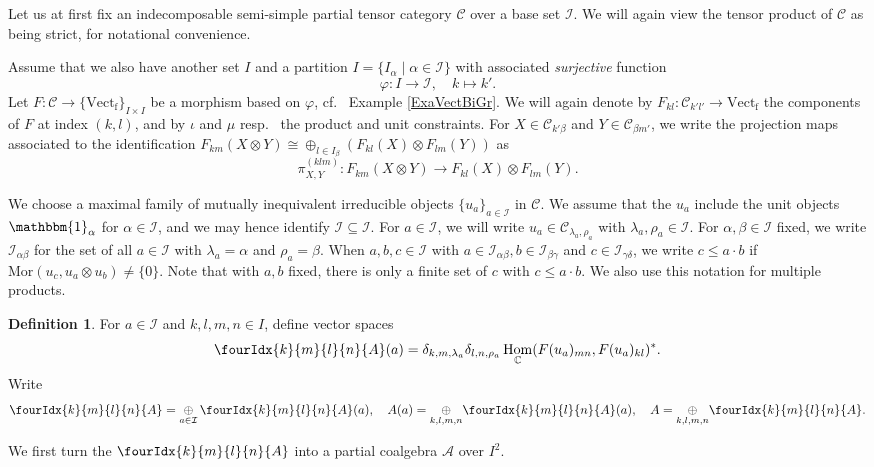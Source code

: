 \documentclass[11pt]{article}
\DeclareMathOperator{\fin}{\mathrm{f}}
\DeclareMathOperator{\Hom}{Hom}
\newcommand{\C}{\mathbb{C}}
\newcommand{\CatC}{\mathcal{C}}
\newcommand{\CatCC}{\mathscr{C}}
\newcommand{\Mor}{\mathrm{Mor}}
\newcommand{\Vect}{\mathrm{Vect}}
\newcommand{\Unitb}{\mathbbm{1}}
\newcommand{\Gr}[5]{\fourIdx{#2}{#4}{#3}{#5}{#1}}%
\theoremstyle{definition}
\newtheorem{Def}[Theorem]{Definition}
\numberwithin{equation}{section}
\begin{document}
Let us at first fix an indecomposable semi-simple partial tensor category $\CatCC$ over a base set $\mathscr{I}$. We will again view the tensor product of $\CatC$ as being strict, for notational convenience. 

Assume that we also have another set $I$ and a partition $I = \{I_\alpha\mid \alpha\in \mathscr{I}\}$ with associated \emph{surjective} function \[\varphi:I\rightarrow \mathscr{I}, \quad k\mapsto k'.\] Let $F: \CatCC\rightarrow \{\Vect_{\fin}\}_{I\times I}$ be a morphism based on $\varphi$, cf.~ Example \ref{ExaVectBiGr}.  We will again denote by $F_{kl}:\CatCC_{k'l'}\rightarrow \Vect_{\fin}$ the components of $F$ at index $(k,l)$, and by $\iota$ and $\mu$ resp.~ the product and unit constraints.  For $X\in \CatC_{k'\beta}$ and $Y\in \CatC_{\beta m'}$, we write the projection maps associated to the identification $F_{km}(X\otimes Y)\cong \oplus_{l\in I_\beta} \left(F_{kl}(X)\otimes F_{lm}(Y)\right)$ as \[\pi^{(klm)}_{X,Y}:F_{km}(X\otimes Y) \rightarrow F_{kl}(X)\otimes F_{lm}(Y).\]

We choose a maximal family of mutually inequivalent irreducible objects $\{u_a\}_{a\in \mathcal{I}}$ in $\CatC$. We assume that the $u_a$ include the unit objects $\Unitb_{\alpha}$ for $\alpha\in \mathscr{I}$, and we may hence identify $\mathscr{I}\subseteq \mathcal{I}$. For $a\in \mathcal{I}$, we will write $u_a \in \CatC_{\lambda_a,\rho_a}$ with $\lambda_a,\rho_a\in \mathscr{I}$. For $\alpha,\beta\in \mathscr{I}$ fixed, we write $\mathcal{I}_{\alpha\beta}$ for the set of all $a\in \mathcal{I}$ with $\lambda_a=\alpha$ and $\rho_a=\beta$. When $a,b,c\in \mathcal{I}$ with $a\in \mathcal{I}_{\alpha\beta},b\in \mathcal{I}_{\beta\gamma}$ and $c\in \mathcal{I}_{\gamma\delta}$, we write $c\leq a\cdot b$ if $\Mor(u_c,u_a\otimes u_b)\neq \{0\}$. Note that with $a,b$ fixed, there is only a finite set of $c$ with $c\leq a\cdot b$. We also use this notation for multiple products.

\begin{Def} For $a\in \mathcal{I}$ and $k,l,m,n\in I$, define vector spaces \[\Gr{A}{k}{l}{m}{n}(a) =  \delta_{k,m,\lambda_a}\delta_{l,n,\rho_a} \Hom_{\C}(F(u_a)_{mn},F(u_a)_{kl})^*.\] Write \[\Gr{A}{k}{l}{m}{n} =\underset{a\in \mathcal{I}}{\oplus}\, \Gr{A}{k}{l}{m}{n}(a),\quad A(a) = \underset{k,l,m,n}{\oplus} \Gr{A}{k}{l}{m}{n}(a),\quad A = \underset{k,l,m,n}{\oplus} \Gr{A}{k}{l}{m}{n}.\] 
\end{Def} 

We first turn the $\Gr{A}{k}{l}{m}{n}$ into a partial coalgebra $\mathscr{A}$ over $I^2$.
\end{document}
